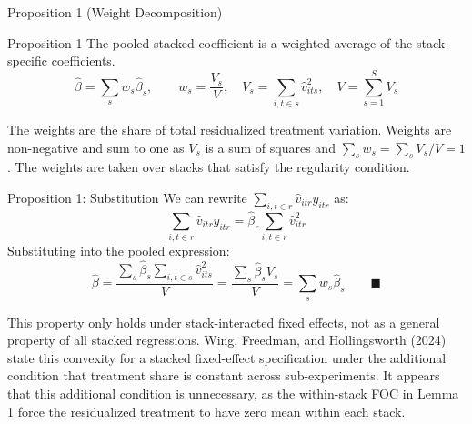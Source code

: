 \documentclass[11pt]{beamer}
\begin{document}
\begin{frame}{Proposition 1 (Weight Decomposition)}
    \begin{block}{Proposition 1}
        The pooled stacked coefficient is a weighted average of the
        stack-specific coefficients.
        \[
            \hat{\beta} = \sum_s w_s \hat{\beta}_s,
            \qquad
            w_s = \frac{V_s}{V},
            \quad
            V_s = \sum_{i,t \in s} \hat{v}_{its}^2,
            \quad
            V = \sum_{s=1}^{S} V_s
        \]
    \end{block}

    The weights are the share of total residualized treatment variation. Weights
    are non-negative and sum to one as $V_s$ is a sum of squares and
    $\sum_s w_s = \sum_s V_s / V = 1$. The weights are taken over stacks that
    satisfy the regularity condition.
\end{frame}

\begin{frame}{Proposition 1: Substitution}
    We can rewrite $\sum_{i,t \in r} \hat{v}_{itr} y_{itr}$ as:
    \[
        \sum_{i,t \in r} \hat{v}_{itr} y_{itr}
        = \hat{\beta}_r \sum_{i,t \in r} \hat{v}_{itr}^2
    \]
    Substituting into the pooled expression:
    \[
        \hat{\beta}
        = \frac{\sum_s \hat{\beta}_s \sum_{i,t \in s} \hat{v}_{its}^2}{V}
        = \frac{\sum_s \hat{\beta}_s V_s}{V}
        = \sum_s w_s \hat{\beta}_s
        \qquad \blacksquare
    \]

    \vspace{5mm}

    \footnotesize
    This property only holds under stack-interacted fixed effects, not as a
    general property of all stacked regressions. Wing, Freedman, and
    Hollingsworth (2024) state this convexity for a stacked fixed-effect
    specification under the additional condition that treatment share is constant
    across sub-experiments. It appears that this additional condition is
    unnecessary, as the within-stack FOC in Lemma 1 force the residualized
    treatment to have zero mean within each stack.
\end{frame}
\end{document}
